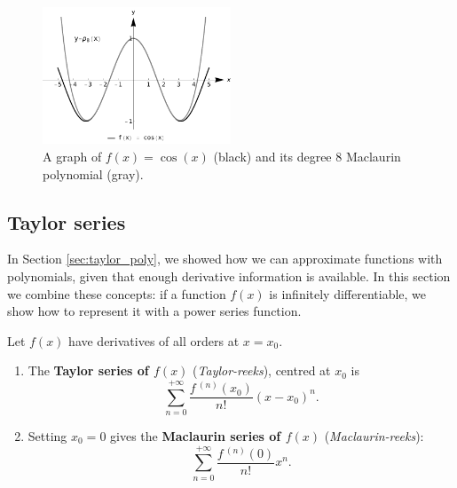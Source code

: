 \begin{example}
\begin{figure}[H]
	\begin{center}
			\includegraphics[width=0.5\textwidth]{fig_diff_18}
	\caption{A graph of $f(x)= \cos(x)$ (black) and its degree 8 Maclaurin polynomial (gray).}
	\label{fig_diff_18}
	\end{center}
\end{figure}

\end{example}

\subsection{Taylor series}\label{sec:taylor_series}

In Section \ref{sec:taylor_poly}, we showed how we can approximate functions with polynomials, given that enough derivative information is available. In this section we combine these concepts: if a function $f(x)$ is infinitely differentiable, we show how to represent it with a power series function.

\begin{definition}\label{def:taylor_series}
Let $f(x)$ have derivatives of all orders at $x=x_0$.
\begin{enumerate}
	\item The \textbf{Taylor series of $f(x)$} (\textit{Taylor-reeks}), centred at $x_0$ is
	$$\sum_{n=0}^{+\infty} \frac{f\,^{(n)}(x_0)}{n!}(x-x_0)^n.$$
	\item	Setting $x_0=0$ gives the \textbf{Maclaurin series of $f(x)$} (\textit{Maclaurin-reeks}):
	$$\sum_{n=0}^{+\infty} \frac{f\,^{(n)}(0)}{n!}x^n.$$
\end{enumerate}
\end{definition}

